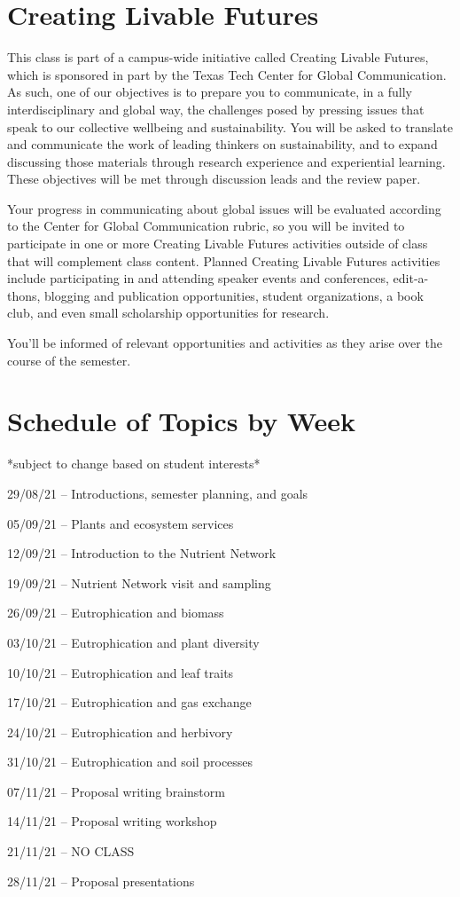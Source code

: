 \documentclass[12pt, notitlepage]{article}   	%
\begin{document}
{\section{Creating Livable Futures}
This class is part of a campus-wide initiative called Creating Livable Futures, 
which is sponsored in part by the Texas Tech Center for Global Communication. 
As such, one of our objectives is to prepare you to communicate, 
in a fully interdisciplinary and global way, the challenges posed by pressing issues 
that speak to our collective wellbeing and sustainability. You will be asked to translate 
and communicate the work of leading thinkers on sustainability, and to expand discussing 
those materials through research experience and experiential learning.
These objectives will be met through discussion leads and the review paper. 

Your progress in communicating about global issues will be evaluated according to the 
Center for Global Communication rubric, so you will be invited to participate 
in one or more Creating Livable Futures activities outside of class that will 
complement class content. 
Planned Creating Livable Futures activities include participating in and attending 
speaker events and conferences, edit-a-thons, blogging and publication opportunities, 
student organizations, a book club, and even small scholarship opportunities for research. 

You’ll be informed of relevant opportunities and activities as they arise over 
the course of the semester.

\newpage

\section*{Schedule of Topics by Week}
*subject to change based on student interests* \par
29/08/21 – Introductions, semester planning, and goals \par
05/09/21 – Plants and ecosystem services \par
12/09/21 – Introduction to the Nutrient Network \par
19/09/21 – Nutrient Network visit and sampling \par
26/09/21 – Eutrophication and biomass \par
03/10/21 – Eutrophication and plant diversity \par
10/10/21 – Eutrophication and leaf traits \par
17/10/21 – Eutrophication and gas exchange \par
24/10/21 – Eutrophication and herbivory \par
31/10/21 – Eutrophication and soil processes \par
07/11/21 – Proposal writing brainstorm \par
14/11/21 – Proposal writing workshop \par
21/11/21 – NO CLASS \par
28/11/21 – Proposal presentations \par

} %
\end{document}
